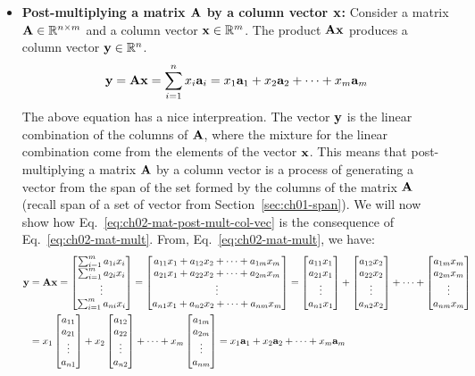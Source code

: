 \begin{itemize}
    \item \textbf{Post-multiplying a matrix $\mathbf{A}$ by a column vector $\mathbf{x}$:} Consider a matrix $\mathbf{A} \in \mathbb{R}^{n \times m}$ and a column vector $\mathbf{x} \in \mathbb{R}^m$. The product $\mathbf{A}\mathbf{x}$ produces a column vector $\mathbf{y} \in \mathbb{R}^n$.
    \begin{equation}
        \mathbf{y} = \mathbf{A}\mathbf{x} = \sum_{i=1}^n x_i\mathbf{a}_i = x_1 \mathbf{a}_1 + x_2 \mathbf{a}_2 + \cdots + x_m\mathbf{a}_m
        \label{eq:ch02-mat-post-mult-col-vec}
    \end{equation}
    The above equation has a nice interpreation. The vector $\mathbf{y}$ is the linear combination of the columns of $\mathbf{A}$, where the mixture for the linear combination come from the elements of the vector $\mathbf{x}$. This means that post-multiplying a matrix $\mathbf{A}$ by a column vector is a process of generating a vector from the span of the set formed by the columns of the matrix $\mathbf{A}$ (recall span of a set of vector from Section~\ref{sec:ch01-span}). We will now show how Eq.~\ref{eq:ch02-mat-post-mult-col-vec} is the consequence of Eq.~\ref{eq:ch02-mat-mult}. From, Eq.~\ref{eq:ch02-mat-mult}, we have:
    \[ \begin{split}
        \mf{y} &= \mf{A}\mf{x} = \bmxc \sum_{i=1}^m a_{1i}x_i \\ \sum_{i=1}^m a_{2i}x_i \\ \vdots \\ \sum_{i=1}^m a_{ni}x_i \emx = \bmxc a_{11}x_1 + a_{12}x_2 + \cdots + a_{1m}x_m \\ a_{21}x_1 + a_{22}x_2 + \cdots + a_{2m}x_m \\ \vdots \\ a_{n1}x_1 + a_{n2}x_2 + \cdots + a_{nm}x_m \emx = \bmxc a_{11}x_1 \\ a_{21}x_1 \\ \vdots \\ a_{n1}x_1\emx + \bmxc a_{12}x_2 \\ a_{22}x_2 \\ \vdots \\ a_{n2}x_2\emx + \cdots + \bmxc a_{1m}x_m \\ a_{2m}x_m \\ \vdots \\ a_{nm}x_m \emx \\
        &= x_1 \bmxc a_{11} \\ a_{21} \\ \vdots \\ a_{n1}\emx + x_2 \bmxc a_{12} \\ a_{22} \\ \vdots \\ a_{n2}\emx + \cdots + x_m\bmxc a_{1m} \\ a_{2m} \\ \vdots \\ a_{nm} \emx = x_1 \mf{a}_1 + x_2 \mf{a}_2 + \cdots + x_m\mf{a}_m
    \end{split} \]
    

\end{itemize}
